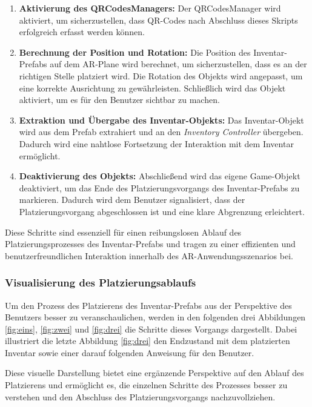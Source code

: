 \begin{enumerate}
    \item \textbf{Aktivierung des QRCodesManagers:} Der QRCodesManager wird aktiviert, um sicherzustellen, dass QR-Codes
    nach Abschluss dieses Skripts erfolgreich erfasst werden können.

    \item \textbf{Berechnung der Position und Rotation:} Die Position des Inventar-Prefabs auf dem AR-Plane wird berechnet,
    um sicherzustellen, dass es an der richtigen Stelle platziert wird. Die Rotation des Objekts wird angepasst, um eine
    korrekte Ausrichtung zu gewährleisten. Schließlich wird das Objekt aktiviert, um es für den Benutzer sichtbar zu machen.

    \item \textbf{Extraktion und Übergabe des Inventar-Objekts:} Das Inventar-Objekt wird aus dem Prefab extrahiert und an
    den \textit{Inventory Controller} übergeben. Dadurch wird eine nahtlose Fortsetzung der Interaktion mit dem Inventar ermöglicht.

    \item \textbf{Deaktivierung des Objekts:} Abschließend wird das eigene Game-Objekt deaktiviert, um das Ende des
    Platzierungsvorgangs des Inventar-Prefabs zu markieren. Dadurch wird dem Benutzer signalisiert, dass der Platzierungsvorgang
    abgeschlossen ist und eine klare Abgrenzung erleichtert.
\end{enumerate}

Diese Schritte sind essenziell für einen reibungslosen Ablauf des Platzierungsprozesses des Inventar-Prefabs und tragen
zu einer effizienten und benutzerfreundlichen Interaktion innerhalb des AR-Anwendungsszenarios bei.

\subsubsection{Visualisierung des Platzierungsablaufs}\label{sec:platzierungsablauf}
Um den Prozess des Platzierens des Inventar-Prefabs aus der Perspektive des Benutzers besser zu veranschaulichen, werden
in den folgenden drei Abbildungen \ref{fig:eins}, \ref{fig:zwei} und \ref{fig:drei} die Schritte dieses Vorgangs dargestellt.
Dabei illustriert die letzte Abbildung \ref{fig:drei} den Endzustand mit dem platzierten Inventar sowie einer darauf
folgenden Anweisung für den Benutzer.

Diese visuelle Darstellung bietet eine ergänzende Perspektive auf den Ablauf des Platzierens und ermöglicht es, die
einzelnen Schritte des Prozesses besser zu verstehen und den Abschluss des Platzierungsvorgangs nachzuvollziehen.

